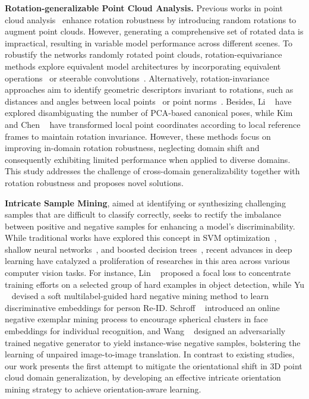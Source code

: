 \noindent\textbf{Rotation-generalizable Point Cloud Analysis.}
Previous works in point cloud analysis~\cite{qi2017pointnet, wang2019dynamic} enhance rotation robustness by introducing random rotations to augment point clouds. {However, generating a comprehensive set of rotated data is impractical, resulting in variable model performance across different scenes. To robustify the networks \wrt randomly rotated point clouds,} rotation-equivariance methods explore equivalent model architectures by incorporating equivalent operations~\cite{su2022svnet, Deng_2021_ICCV, luo2022equivariant} or steerable convolutions~\cite{chen2021equivariant, poulenard2021functional}.
Alternatively, rotation-invariance approaches aim to identify geometric descriptors invariant to rotations, such as distances and angles between local points~\cite{chen2019clusternet, zhang2020global} or point norms~\cite{zhao2019rotation, li2021rotation}. Besides, {Li \etal~\cite{li2021closer} have explored disambiguating the number of PCA-based canonical poses, while Kim \etal~\cite{kim2020rotation} and Chen \etal~\cite{chen2022devil} have transformed local point coordinates according to local reference frames to maintain rotation invariance. However, these methods focus on improving in-domain rotation robustness, neglecting domain shift and consequently exhibiting limited performance when applied to diverse domains. This study addresses the challenge of cross-domain generalizability together with rotation robustness and proposes novel solutions.} 

\noindent\textbf{Intricate Sample Mining}, aimed at identifying or synthesizing challenging samples that are difficult to classify correctly, seeks to rectify the imbalance between positive and negative samples for enhancing a model's discriminability. While traditional works have explored this concept in SVM optimization~\cite{felzenszwalb2009object}, shallow neural networks~\cite{dollar2009integral}, and boosted decision trees~\cite{yu2019unsupervised}, recent advances in deep learning have catalyzed a proliferation of researches in this area across various computer vision tasks. For instance, 
Lin \etal~\cite{lin2017focal} proposed a focal loss to concentrate training efforts on a selected group of hard examples in object detection, while Yu \etal~\cite{yu2019unsupervised} devised a soft multilabel-guided hard negative mining method to learn discriminative embeddings for person Re-ID. Schroff \etal~\cite{schroff2015facenet} introduced an online negative exemplar mining process to encourage spherical clusters in face embeddings for individual recognition, and Wang \etal~\cite{wang2021instance} designed an adversarially trained negative generator to yield instance-wise negative samples, bolstering the learning of unpaired image-to-image translation. In contrast to existing studies, our work presents the first attempt to mitigate the orientational shift in 3D point cloud domain generalization, by developing an effective intricate orientation mining strategy to achieve orientation-aware learning.

